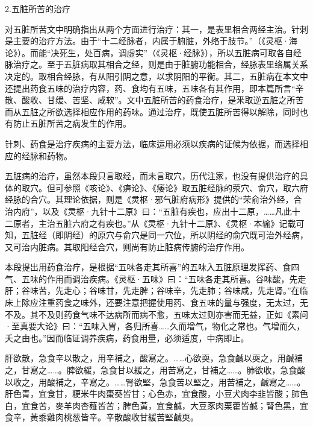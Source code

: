 \documentclass[draft,12pt]{ctexbook}
\begin{document}
2.五脏所苦的治疗

对五脏所苦文中明确指出从两个方面进行治疗：其一，是表里相合两经主治。针刺是主要的治疗方法。由于“十二经脉者，内属于腑脏，外络于肢节。”（《灵枢·海论》）。而能“决死生，处百病，调虚实”（《灵枢·经脉》），所以五脏病可取各自经脉治疗之。至于五脏病取其相合之经，则是由于脏腑功能相合，经脉表里络属关系决定的。取相合经脉，有从阳引阴之意，以求阴阳的平衡。其二，五脏病在本文中还提出药食五味的治疗内容，药、食均有五味，五味各有其作用，即本篇所言“辛散、酸收、甘缓、苦坚、咸软”。文中五脏所苦的药食治疗，是釆取逆五脏之所苦而从五脏之所欲选择相应作用的药味。通过治疗，既使五脏所苦得以解除，同时也有防止五脏所苦之病发生的作用。



针刺、药食是治疗疾病的主要方法，临床运用必须以疾病的证候为依据，而选择相应的经脉和药物。

五脏病的治疗，虽然本段只言取经，而未言取穴，历代注家，也没有提供治疗的具体的取穴。但可参照《咳论》、《痹论》、《痿论》取五脏经脉的荥穴、俞穴，取六府经脉的合穴。其理论依据，则是《灵枢·邪气脏府病形》提供的“荣俞治外经，合治内府”，以及《灵枢·九针十二原》曰：“五脏有疾也，应出十二原，……凡此十二原者，主治五脏六府之有疾也。”从《灵枢·九针十二原》、《灵枢·本输》记载可知，五脏经（即阴经）的原穴与俞穴是同一穴位，所以阴经的俞穴既可治外经病，又可治内脏病。其取阳经合穴，则尚有防止脏病传腑的治疗作用。

本段提出用药食治疗，是根据“五味各走其所喜”的五味入五脏原理发挥药、食四气、五味的作用而调治疾病。《灵枢·五味》曰：“五味各走其所喜。谷味酸，先走肝；谷味苦，先走心；谷味甘，先走脾；谷味辛，先走肺；谷味咸，先走肾。”在临床上除应注重药食之味外，还要注意把握使用药、食五味的量与强度，无太过，无不及。其不及则药食气味不达病所而病不愈，五味太过则亦害而无益，正如《素问·至真要大论》曰：“五味入胃，各归所喜……久而增气，物化之常也。气增而久，夭之由也。”因而临证调养疾病，药食用量，必须适度，中病即止。


\begin{yuanwen}
肝欲散，急食辛以散之，用辛補之，酸寫之。……心欲耎，急食鹹以耎之，用鹹補之，甘寫之……。脾欲緩，急食甘以緩之，用苦寫之，甘補之……。肺欲收，急食酸以收之，用酸補之，辛寫之。……腎欲堅，急食苦以堅之，用苦補之，鹹寫之……。肝色青，宜食甘，粳米牛肉棗葵皆甘；心色赤，宜食酸，小豆犬肉李韭皆酸；肺色白，宜食苦，麥羊肉杏薤皆苦；脾色黃，宜食鹹，大豆豕肉栗藿皆鹹；腎色黑，宜食辛，黃黍雞肉桃葱皆辛。辛散酸收甘緩苦堅鹹耎。
\end{yuanwen}
\end{document}
